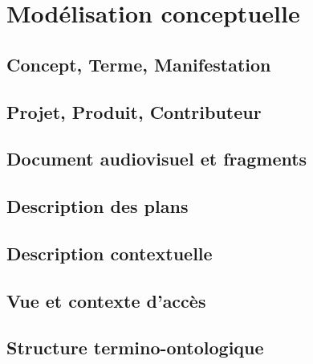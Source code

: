 \section{Modélisation conceptuelle}\label{sec:concept}

\subsection{Concept, Terme, Manifestation}\label{}


\subsection{Projet, Produit, Contributeur}\label{}


\subsection{Document audiovisuel et fragments}\label{}


\subsection{Description des plans}\label{}


\subsection{Description contextuelle}\label{}


\subsection{Vue et contexte d'accès}\label{}


\subsection{Structure termino-ontologique}